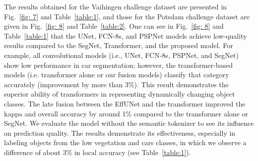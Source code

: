 \documentclass[journal]{IEEEtran}
\begin{document}
The results obtained for the Vaihingen challenge dataset are presented in Fig.~\ref{fig: 7} and Table~\ref{table:1}, and those for the Potsdam challenge dataset are given in Fig.~\ref{fig: 8} and Table~\ref{table:2}. One can see in Fig.~\ref{fig: 8} and Table~\ref{table:1} that the UNet, FCN-8s, and PSPNet models achieve low-quality results compared to the SegNet, Transformer, and the proposed model. For example, all convolutional models (i.e., UNet, FCN-8s, PSPNet, and SegNet) show low performance in car segmentation; however, the transformer-based models (i.e. transformer alone or our fusion models) classify that category accurately (improvement by more than 3\%). This result demonstrates the superior ability of transformers in representing dynamically changing object classes. The late fusion between the EffUNet and the transformer improved the kappa and overall accuracy by around 1\% compared to the transformer alone or SegNet. We evaluate the model without the semantic tokenizer to see its influence on prediction quality. The results demonstrate its effectiveness, especially in labeling objects from the low vegetation and cars classes, in which we observe a difference of about 3\% in local accuracy (see Table~\ref{table:1}).
\end{document}
